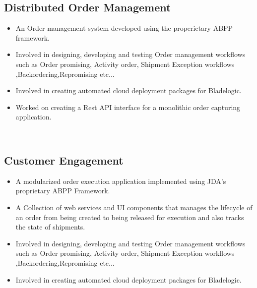 \documentclass[letterpaper]{twentysecondcv} %
\begin{document}
\begin{twenty}
{		\subsection{Distributed Order Management}
		\vspace{3mm}
		\begin{itemize}[leftmargin=*]
			\item An Order management system developed using the properietary ABPP framework.
			\item Involved in designing, developing and testing Order management workflows such as Order promising, Activity order, Shipment Exception workflows ,Backordering,Repromising etc...
			\item Involved in creating automated cloud deployment packages for Bladelogic.
			\item Worked on creating a Rest API interface for a monolithic order capturing application.
		\end{itemize}
		~\\

		\subsection{Customer Engagement}
		\vspace{3mm}
		\begin{itemize}[leftmargin=*]
			\item A modularized order execution application implemented using JDA’s proprietary ABPP Framework.
			\item A Collection of web services and UI components that manages the lifecycle of an order from being created to being released for execution and also tracks the state of shipments. 
			\item Involved in designing, developing and testing Order management workflows such as Order promising, Activity order, Shipment Exception workflows ,Backordering,Repromising etc...
			\item Involved in creating automated cloud deployment packages for Bladelogic. 
		\end{itemize}
		~\\		
	}
	
\end{twenty}

\end{document}
